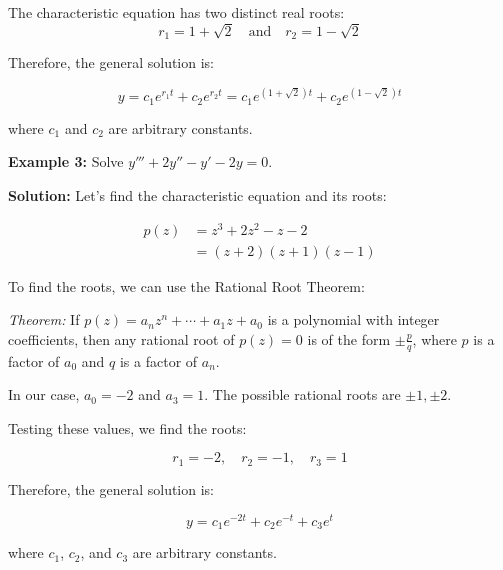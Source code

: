 \documentclass{article}
\begin{document}
The characteristic equation has two distinct real roots:
\[
r_1 = 1+\sqrt{2} \quad \text{and} \quad r_2 = 1-\sqrt{2}
\]

Therefore, the general solution is:

\[
y = c_1e^{r_1t} + c_2e^{r_2t} = c_1e^{(1+\sqrt{2})t} + c_2e^{(1-\sqrt{2})t}
\]

where $c_1$ and $c_2$ are arbitrary constants.

\textbf{Example 3:} Solve $y''' + 2y'' - y' - 2y = 0$.

\textbf{Solution:}
Let's find the characteristic equation and its roots:

\begin{align*}
p(z) &= z^3 + 2z^2 - z - 2 \\
     &= (z+2)(z+1)(z-1)
\end{align*}

To find the roots, we can use the Rational Root Theorem:

\textit{Theorem:} If $p(z) = a_nz^n + \cdots + a_1z + a_0$ is a polynomial with integer coefficients, then any rational root of $p(z) = 0$ is of the form $\pm \frac{p}{q}$, where $p$ is a factor of $a_0$ and $q$ is a factor of $a_n$.

In our case, $a_0 = -2$ and $a_3 = 1$. The possible rational roots are $\pm 1, \pm 2$.

Testing these values, we find the roots:

\[
r_1 = -2, \quad r_2 = -1, \quad r_3 = 1
\]

Therefore, the general solution is:

\[
y = c_1e^{-2t} + c_2e^{-t} + c_3e^t
\]

where $c_1$, $c_2$, and $c_3$ are arbitrary constants.
\end{document}
